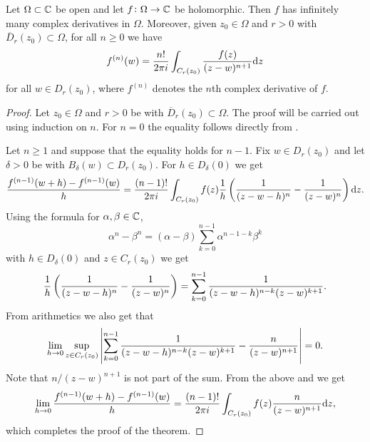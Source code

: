 \documentclass[11pt,a4paper]{article}
\begin{document}
\begin{theorem}
  \label{thm:nderivative}
  Let $\Omega \subset \mathbb{C}$ be open and let $f \colon \Omega \to \mathbb{C}$ be
  holomorphic.
  Then $f$ has infinitely many complex derivatives in $\Omega$.
  Moreover, given $z_0 \in \Omega$ and $r > 0$ with
  $\overline D_r(z_0) \subset \Omega$,
  for all $n \geq 0$ we have
  \[
    f^{(n)}(w) =
    \frac{n!}{2 \pi i} \int_{C_r(z_0)} \frac{f(z)}{(z - w)^{n+1}} \mathrm{d} z
  \]
  for all $w \in D_r(z_0)$, where $f^{(n)}$ denotes the $n$th complex
  derivative of $f$.
\end{theorem}
\begin{proof}
  Let $z_0 \in \Omega$ and $r > 0$ be with $\overline D_r(z_0) \subset \Omega$.
  The proof will be carried out using induction on $n$.
  For $n = 0$ the equality follows directly from
  .

  Let $n \geq 1$ and suppose that the equality holds for $n - 1$.
  Fix $w \in D_r(z_0)$ and let $\delta > 0$ be with
  $B_{\delta}(w) \subset D_r(z_0)$.
  For $h \in D_{\delta}(0)$ we get
  \[
    \frac{f^{(n-1)}(w + h) - f^{(n-1)}(w)}{h} =
    \frac{(n-1)!}{2 \pi i}
    \int_{C_r(z_0)} f(z) \frac{1}{h}
    \del{
      \frac{1}{(z - w - h)^{n}} -
      \frac{1}{(z - w)^{n}}
    } \dz.
  \]
  Using the formula for $\alpha, \beta \in \mathbb{C}$,
  \[
    \alpha^n - \beta^n =
    (\alpha - \beta) \sum_{k=0}^{n-1} \alpha^{n - 1 - k} \beta^{k}
  \]
  with $h \in D_{\delta}(0)$ and $z \in C_r(z_0)$ we get
  \[
    \frac{1}{h}
    \del{
      \frac{1}{(z - w - h)^{n}} -
      \frac{1}{(z - w)^{n}}
    } =
    \sum_{k=0}^{n-1} \frac{1}{(z - w - h)^{n-k} (z - w)^{k+1}}.
  \]
  From arithmetics we also get that
  \[
    \lim_{h \to 0} \sup_{z \in C_r(z_0)}
    \left\lvert
      \sum_{k=0}^{n-1}
      \frac{1}{(z - w - h)^{n-k} (z - w)^{k+1}} - \frac{n}{(z-w)^{n+1}}
    \right\rvert = 0.
  \]
  Note that $n / (z - w)^{n+1}$ is not part of the sum.
  From the above and  we get
  \[
    \lim_{h \to 0} \frac{f^{(n-1)}(w + h) - f^{(n-1)}(w)}{h} =
    \frac{(n-1)!}{2 \pi i} \int_{C_r(z_0)} f(z) \frac{n}{(z - w)^{n+1}} \mathrm{d} z,
  \]
  which completes the proof of the theorem.
\end{proof}
\end{document}
